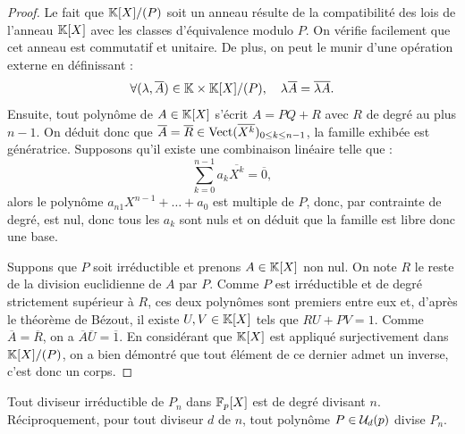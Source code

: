 \begin{proof}
Le fait que $\mathbb{K}[X]/(P)$ soit un anneau résulte de la compatibilité des lois de l'anneau $\mathbb{K}[X]$ avec les classes d'équivalence modulo $P$.
On vérifie facilement que cet anneau est commutatif et unitaire. 
De plus, on peut le munir d'une opération externe en définissant :
\[ \forall (\lambda, \overline{A}) \in \mathbb{K} \times \mathbb{K}[X]/(P), \quad \lambda \overline{A} = \overline{\lambda A} . \]
Ensuite, tout polynôme de $A \in \mathbb{K}[X]$ s'écrit $A = PQ + R$ avec $R$ de degré au plus $n-1$. 
On déduit donc que $\overline{A} = \overline{R} \in \operatorname{Vect}(\overline{X^k})_{0 \leq k \leq n-1}$, la famille exhibée est génératrice.
Supposons qu'il existe une combinaison linéaire telle que :
\[ \sum_{k=0}^{n-1} a_k \overline{X^k} = \overline{0} , \]
alors le polynôme $a_{n1} X^{n-1} + \dots + a_0$ est multiple de $P$, donc, par contrainte de degré, est nul, 
donc tous les $a_k$ sont nuls et on déduit que la famille est libre donc une base. \newline

Suppons que $P$ soit irréductible et prenons $A \in \mathbb{K}[X]$ non nul. On note $R$ le reste de la division euclidienne de $A$ par $P$.
Comme $P$ est irréductible et de degré strictement supérieur à $R$, ces deux polynômes sont premiers entre eux et, d'après le théorème 
de Bézout, il existe $U, V \in \mathbb{K}[X]$ tels que $RU + PV = 1$. 
Comme $\overline{A} = \overline{R}$, on a $\overline{A}\overline{U} = \overline{1}$. 
En considérant que $\mathbb{K}[X]$ est appliqué surjectivement dans $\mathbb{K}[X]/(P)$, 
on a bien démontré que tout élément de ce dernier admet un inverse, c'est donc un corps.
\end{proof}


\begin{lem}
\label{lem:divPn}
Tout diviseur irréductible de $P_n$ dans $\mathbb{F}_p[X]$ est de degré divisant $n$. Réciproquement, pour tout diviseur $d$ de $n$, 
tout polynôme $P \in \mathcal{U}_d(p)$ divise $P_n$.
\end{lem}

